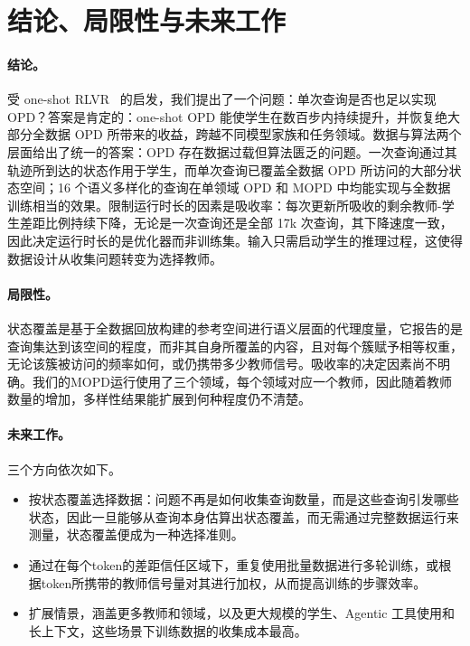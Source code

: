 \section{结论、局限性与未来工作}
\label{sec:conclusion}
\label{sec:limitations}

\paragraph{结论。} 
受 one-shot RLVR~\citep{wang2025oneshot} 的启发，我们提出了一个问题：单次查询是否也足以实现 OPD？答案是肯定的：one-shot OPD 能使学生在数百步内持续提升，并恢复绝大部分全数据 OPD 所带来的收益，跨越不同模型家族和任务领域。数据与算法两个层面给出了统一的答案：OPD 存在数据过载但算法匮乏的问题。一次查询通过其轨迹所到达的状态作用于学生，而单次查询已覆盖全数据 OPD 所访问的大部分状态空间；16 个语义多样化的查询在单领域 OPD 和 MOPD 中均能实现与全数据训练相当的效果。限制运行时长的因素是吸收率：每次更新所吸收的剩余教师-学生差距比例持续下降，无论是一次查询还是全部 17k 次查询，其下降速度一致，因此决定运行时长的是优化器而非训练集。输入只需启动学生的推理过程，这使得数据设计从收集问题转变为选择教师。

\paragraph{局限性。}
状态覆盖是基于全数据回放构建的参考空间进行语义层面的代理度量，它报告的是查询集达到该空间的程度，而非其自身所覆盖的内容，且对每个簇赋予相等权重，无论该簇被访问的频率如何，或仍携带多少教师信号。吸收率的决定因素尚不明确。我们的MOPD运行使用了三个领域，每个领域对应一个教师，因此随着教师数量的增加，多样性结果能扩展到何种程度仍不清楚。

\paragraph{未来工作。}
三个方向依次如下。
\begin{itemize}[topsep=2pt, partopsep=0pt, leftmargin=12pt, itemsep=2pt]
    \item 按状态覆盖选择数据：问题不再是如何收集查询数量，而是这些查询引发哪些状态，因此一旦能够从查询本身估算出状态覆盖，而无需通过完整数据运行来测量，状态覆盖便成为一种选择准则。
    \item 通过在每个token的差距信任区域下，重复使用批量数据进行多轮训练，或根据token所携带的教师信号量对其进行加权，从而提高训练的步骤效率。
    \item 扩展情景，涵盖更多教师和领域，以及更大规模的学生、Agentic 工具使用和长上下文，这些场景下训练数据的收集成本最高。
\end{itemize}